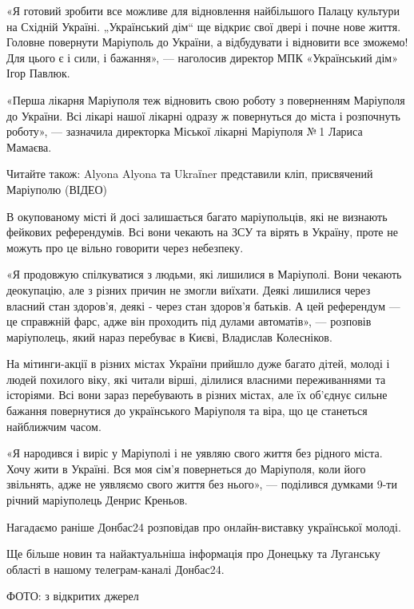 «Я готовий зробити все можливе для відновлення найбільшого Палацу культури на
Східній Україні. „Український дім“ ще відкриє свої двері і почне нове життя.
Головне повернути Маріуполь до України, а відбудувати і відновити все зможемо!
Для цього є і сили, і бажання», — наголосив директор МПК «Український дім» Ігор
Павлюк.

«Перша лікарня Маріуполя теж відновить свою роботу з поверненням Маріуполя до
України. Всі лікарі нашої лікарні одразу ж повернуться до міста і розпочнуть
роботу», — зазначила директорка Міської лікарні Маріуполя № 1 Лариса Мамаєва.

Читайте також: Alyona Alyona та Ukraїner представили кліп, присвячений
Маріуполю (ВІДЕО)

В окупованому місті й досі залишається багато маріупольців, які не визнають
фейкових референдумів. Всі вони чекають на ЗСУ та вірять в Україну, проте не
можуть про це вільно говорити через небезпеку.

«Я продовжую спілкуватися з людьми, які лишилися в Маріуполі. Вони чекають
деокупацію, але з різних причин не змогли виїхати. Деякі лишилися через власний
стан здоров'я, деякі - через стан здоров'я батьків. А цей референдум — це
справжній фарс, адже він проходить під дулами автоматів», — розповів
маріуполець, який нараз перебуває в Києві, Владислав Колесніков.

На мітинги-акції в різних містах України прийшло дуже багато дітей, молоді і
людей похилого віку, які читали вірші, ділилися власними переживаннями та
історіями. Всі вони зараз перебувають в різних містах, але їх об'єднує сильне
бажання повернутися до українського Маріуполя та віра, що це станеться
найближчим часом.

«Я народився і виріс у Маріуполі і не уявляю свого життя без рідного міста.
Хочу жити в Україні. Вся моя сім'я повернеться до Маріуполя, коли його
звільнять, адже не уявляємо свого життя без нього», — поділився думками 9-ти
річний маріуполець Денрис Креньов.

Нагадаємо раніше Донбас24 розповідав про онлайн-виставку української молоді.

Ще більше новин та найактуальніша інформація про Донецьку та Луганську області
в нашому телеграм-каналі Донбас24.

ФОТО: з відкритих джерел
